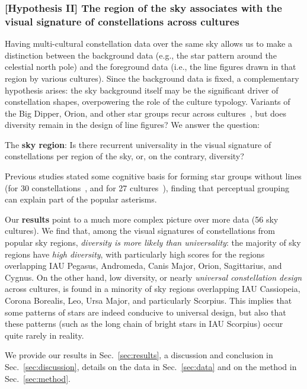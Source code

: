 \documentclass[10pt]{article}
\begin{document}
\subsubsection*{[Hypothesis II] The region of the sky associates with the visual signature of constellations across cultures}
%
Having multi-cultural constellation data over the same sky allows us to make a distinction between the background data (e.g., the star pattern around the celestial north pole) and the foreground data (i.e., the line figures drawn in that region by various cultures). Since the background data is fixed, a complementary hypothesis arises: the sky background itself may be the significant driver of constellation shapes, overpowering the role of the culture typology. Variants of the Big Dipper, Orion, and other star groups recur across cultures~\cite{berezkin2005cosmic,kemp2020perceptual}, but does diversity remain in the design of line figures? We answer the question:
%
\begin{description}
	\setlength\itemsep{0mm}
	\item[II] The {\bf sky region}: Is there recurrent universality in the visual signature of constellations per region of the sky, or, on the contrary, diversity?
\end{description}

Previous studies stated some cognitive basis for forming star groups without lines (for 30 constellations~\cite{dry2009perceptual}, and for 27 cultures~\cite{kemp2020perceptual}), finding that perceptual grouping can explain part of the popular asterisms. 

Our {\bf results} point to a much more complex picture over more data (56 sky cultures). We find that, among the visual signatures of constellations from popular sky regions, \emph{diversity is more likely than universality}: the majority of sky regions have \emph{high diversity}, with particularly high scores for the regions overlapping IAU Pegasus, Andromeda, Canis Major, Orion, Sagittarius, and Cygnus. On the other hand, low diversity, or nearly \emph{universal constellation design} across cultures, is found in a minority of sky regions overlapping IAU Cassiopeia, Corona Borealis, Leo, Ursa Major, and particularly Scorpius. This implies that some patterns of stars are indeed conducive to universal design, but also that these patterns (such as the long chain of bright stars in IAU Scorpius) occur quite rarely in reality.

We provide our results in Sec.~\ref{sec:results}, a discussion and conclusion in Sec.~\ref{sec:discussion}, details on the data in Sec.~\ref{sec:data} and on the method in Sec.~\ref{sec:method}.
\end{document}
